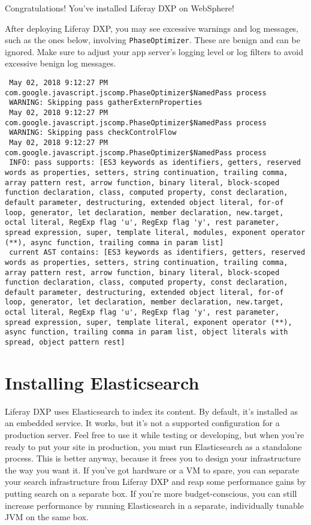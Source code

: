 Congratulations! You've installed Liferay DXP on WebSphere!

\noindent\hrulefill

After deploying Liferay DXP, you may see excessive warnings and log
messages, such as the ones below, involving \texttt{PhaseOptimizer}.
These are benign and can be ignored. Make sure to adjust your app
server's logging level or log filters to avoid excessive benign log
messages.

\begin{verbatim}
 May 02, 2018 9:12:27 PM com.google.javascript.jscomp.PhaseOptimizer$NamedPass process
 WARNING: Skipping pass gatherExternProperties
 May 02, 2018 9:12:27 PM com.google.javascript.jscomp.PhaseOptimizer$NamedPass process
 WARNING: Skipping pass checkControlFlow
 May 02, 2018 9:12:27 PM com.google.javascript.jscomp.PhaseOptimizer$NamedPass process
 INFO: pass supports: [ES3 keywords as identifiers, getters, reserved words as properties, setters, string continuation, trailing comma, array pattern rest, arrow function, binary literal, block-scoped function declaration, class, computed property, const declaration, default parameter, destructuring, extended object literal, for-of loop, generator, let declaration, member declaration, new.target, octal literal, RegExp flag 'u', RegExp flag 'y', rest parameter, spread expression, super, template literal, modules, exponent operator (**), async function, trailing comma in param list]
 current AST contains: [ES3 keywords as identifiers, getters, reserved words as properties, setters, string continuation, trailing comma, array pattern rest, arrow function, binary literal, block-scoped function declaration, class, computed property, const declaration, default parameter, destructuring, extended object literal, for-of loop, generator, let declaration, member declaration, new.target, octal literal, RegExp flag 'u', RegExp flag 'y', rest parameter, spread expression, super, template literal, exponent operator (**), async function, trailing comma in param list, object literals with spread, object pattern rest]
\end{verbatim}

\section{Installing Elasticsearch}\label{installing-elasticsearch}

Liferay DXP uses Elasticsearch to index its content. By default, it's
installed as an embedded service. It works, but it's not a supported
configuration for a production server. Feel free to use it while testing
or developing, but when you're ready to put your site in production, you
must run Elasticsearch as a standalone process. This is better anyway,
because it frees you to design your infrastructure the way you want it.
If you've got hardware or a VM to spare, you can separate your search
infrastructure from Liferay DXP and reap some performance gains by
putting search on a separate box. If you're more budget-conscious, you
can still increase performance by running Elasticsearch in a separate,
individually tunable JVM on the same box.

